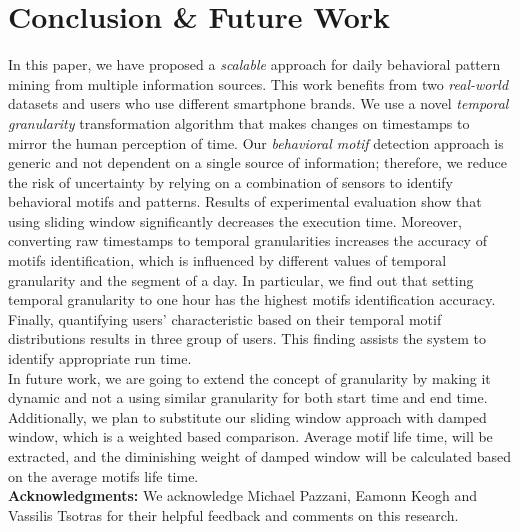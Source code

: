 \documentclass{sig-alternate}
\begin{document}
\section{Conclusion \& Future Work}
In this paper, we have proposed a \emph{scalable} approach for daily behavioral pattern mining from multiple information sources. This work benefits from two \emph{real-world} datasets and users who use different smartphone brands. We use a novel \emph{temporal granularity} transformation algorithm that makes changes on timestamps to mirror the human perception of time. Our \emph{behavioral motif} detection approach is generic and not dependent on a single source of information; therefore, we reduce the risk of uncertainty by relying on a combination of sensors to identify behavioral motifs and patterns. Results of experimental evaluation show that using sliding window significantly decreases the execution time. Moreover, converting raw timestamps to temporal granularities increases the accuracy of motifs identification, which is influenced by different values of temporal granularity and the segment of a day. In particular, we find out that setting temporal granularity to one hour has the highest motifs identification accuracy. Finally, quantifying users' characteristic based on their temporal motif distributions results in three group of users. This finding assists the system to identify appropriate run time.\\
In future work, we are going to extend the concept of granularity by making it dynamic and not a using similar granularity for both start time and end time. Additionally, we plan to substitute our sliding window approach with damped window, which is a weighted based comparison. Average motif life time, will be extracted, and the diminishing weight of damped window will be calculated based on the average motifs life time. \\
\textbf{Acknowledgments:} We acknowledge Michael Pazzani, Eamonn Keogh and Vassilis Tsotras for their helpful feedback and comments on this research. 
\vspace{-0.2cm}
\section*{}
\vspace{-0.4cm}

\small{}
\end{document}
